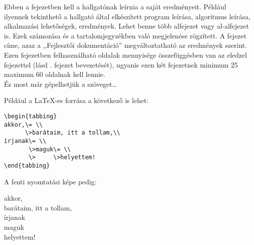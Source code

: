 \label{Chap:dokumen}

Ebben a fejezetben kell a hallgatónak leírnia a saját eredményeit. Például ilyennek tekinthető a hallgató által elkészített program leírása, algoritmus leírása, alkalmazási lehetőségek, eredmények. Lehet benne több alfejezet vagy al-alfejezet is. Ezek számozása és a tartalomjegyzékben való megjelenése rögzített. A fejezet címe, azaz a ,,Fejlesztői dokumentáció'' megváltoztatható az eredmények szerint. Ezen fejezetben felhasználható oldalak mennyisége összefüggésben van az eledzel fejezettel (lásd . fejezet bevezetését), ugyanis ezen két fejezetnek minimum 25 maximum 60 oldalnak kell lennie.\\

És most már gépelhetjük a szöveget\ldots

Például a \LaTeX-es forrása a következő is lehet:
\begin{verbatim}
\begin{tabbing}
akkor,\= \\
      \>barátaim, itt a tollam,\\
írjanak\= \\
       \>maguk\= \\
       \>     \>helyettem!
\end{tabbing}
\end{verbatim}

A fenti nyomtatási képe pedig:
\begin{tabbing}
akkor,\= \\
      \>barátaim, itt a tollam,\\
írjanak\= \\
       \>maguk\= \\
       \>     \>helyettem!
\end{tabbing}
